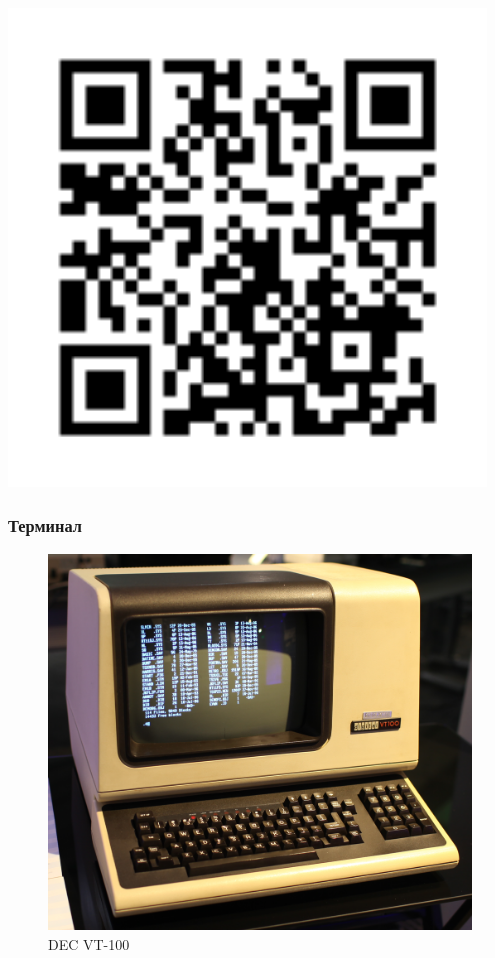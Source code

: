 \documentclass[t,aspectratio=169]{beamer}
\begin{document}
\begin{frame}
\begin{minipage}{0.19\textwidth}
        \includegraphics[width=0.95\textwidth]{tty-qr}
    \end{minipage}
\end{frame}

\begin{frame}
    \frametitle{Терминал}
    \begin{figure}
        \begin{centering}
            \includegraphics[height=0.7\textheight]{vt100}
            \caption{DEC VT-100}
        \end{centering}
    \end{figure}
\end{frame}
\end{document}
